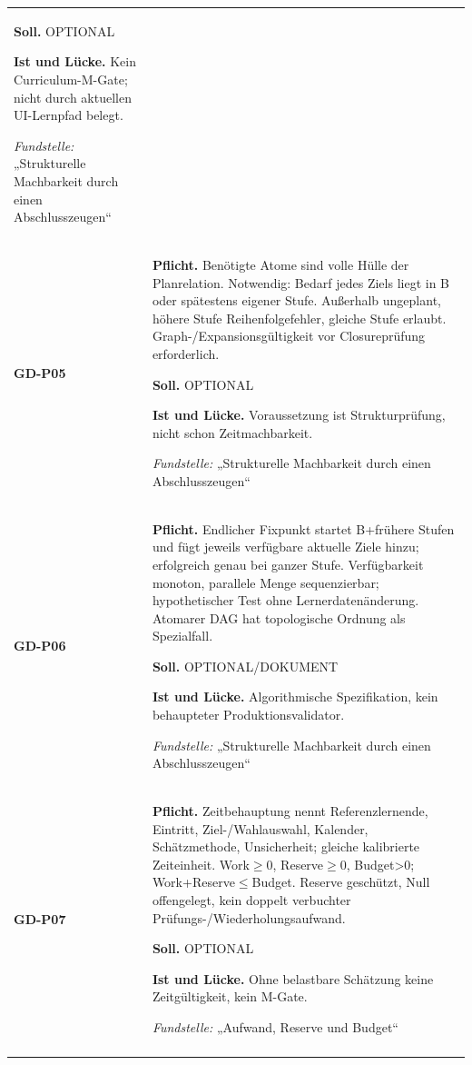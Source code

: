 \begin{longtable}{@{}P{20mm}P{128mm}@{}}
\textbf{Soll.} OPTIONAL\par\smallskip
\textbf{Ist und Lücke.} Kein Curriculum-M-Gate; nicht durch aktuellen UI-Lernpfad belegt.\par\smallskip
\emph{Fundstelle:} „Strukturelle Machbarkeit durch einen Abschlusszeugen“\\\addlinespace[5pt]
\label{rule:GD-P05}\textbf{GD-P05} &
\textbf{Pflicht.} Benötigte Atome sind volle Hülle der Planrelation. Notwendig: Bedarf jedes Ziels liegt in B oder spätestens eigener Stufe. Außerhalb ungeplant, höhere Stufe Reihenfolgefehler, gleiche Stufe erlaubt. Graph-/Expansionsgültigkeit vor Closureprüfung erforderlich.\par\smallskip
\textbf{Soll.} OPTIONAL\par\smallskip
\textbf{Ist und Lücke.} Voraussetzung ist Strukturprüfung, nicht schon Zeitmachbarkeit.\par\smallskip
\emph{Fundstelle:} „Strukturelle Machbarkeit durch einen Abschlusszeugen“\\\addlinespace[5pt]
\label{rule:GD-P06}\textbf{GD-P06} &
\textbf{Pflicht.} Endlicher Fixpunkt startet B+frühere Stufen und fügt jeweils verfügbare aktuelle Ziele hinzu; erfolgreich genau bei ganzer Stufe. Verfügbarkeit monoton, parallele Menge sequenzierbar; hypothetischer Test ohne Lernerdatenänderung. Atomarer DAG hat topologische Ordnung als Spezialfall.\par\smallskip
\textbf{Soll.} OPTIONAL/DOKUMENT\par\smallskip
\textbf{Ist und Lücke.} Algorithmische Spezifikation, kein behaupteter Produktionsvalidator.\par\smallskip
\emph{Fundstelle:} „Strukturelle Machbarkeit durch einen Abschlusszeugen“\\\addlinespace[5pt]
\label{rule:GD-P07}\textbf{GD-P07} &
\textbf{Pflicht.} Zeitbehauptung nennt Referenzlernende, Eintritt, Ziel-/Wahlauswahl, Kalender, Schätzmethode, Unsicherheit; gleiche kalibrierte Zeiteinheit. Work\ensuremath{\geq}0, Reserve\ensuremath{\geq}0, Budget\textgreater{}0; Work+Reserve\ensuremath{\leq}Budget. Reserve geschützt, Null offengelegt, kein doppelt verbuchter Prüfungs-/Wiederholungsaufwand.\par\smallskip
\textbf{Soll.} OPTIONAL\par\smallskip
\textbf{Ist und Lücke.} Ohne belastbare Schätzung keine Zeitgültigkeit, kein M-Gate.\par\smallskip
\emph{Fundstelle:} „Aufwand, Reserve und Budget“\\\addlinespace[5pt]

\end{longtable}
